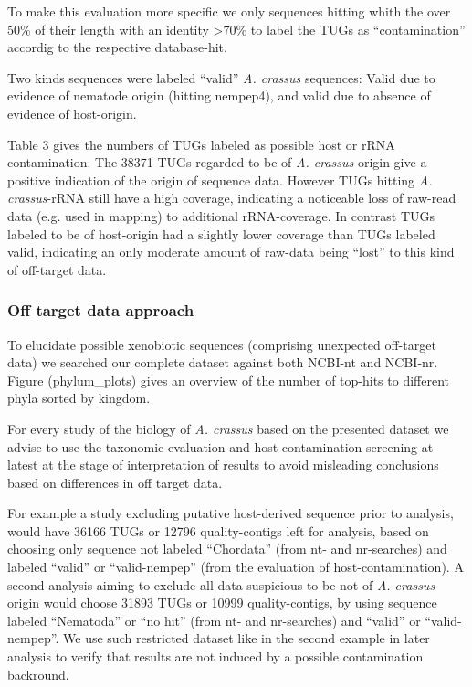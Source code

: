 \documentclass[10pt]{bmc_article}
\newenvironment{bmcformat}{\begin{raggedright}\baselineskip20pt\sloppy\setboolean{publ}{false}}{\end{raggedright}\baselineskip20pt\sloppy}
\begin{document}
\begin{bmcformat}
To make this evaluation more specific we only sequences hitting whith
the over 50\% of their length with an identity >70\% to label the
TUGs as ``contamination'' accordig to the respective database-hit.

Two kinds sequences were labeled ``valid'' \textit{A. crassus}
sequences: Valid due to evidence of nematode origin (hitting nempep4),
and valid due to absence of evidence of host-origin.

Table 3 gives the numbers of TUGs labeled as possible host or rRNA
contamination. The 38371 TUGs regarded to be of
\textit{A. crassus}-origin give a positive indication of the origin of
sequence data. However TUGs hitting \textit{A. crassus}-rRNA still
have a high coverage, indicating a noticeable loss of raw-read data
(e.g. used in mapping) to additional rRNA-coverage. In contrast
TUGs labeled to be of host-origin had a slightly lower coverage than
TUGs labeled valid, indicating an only moderate amount of raw-data
being ``lost'' to this kind of off-target data.

\subsubsection*{Off target data approach}

To elucidate possible xenobiotic sequences (comprising unexpected
off-target data) we searched our complete dataset against both NCBI-nt
and NCBI-nr. Figure (phylum\_plots) gives an overview of the number of
top-hits to different phyla sorted by kingdom.

For every study of the biology of \textit{A. crassus} based on the
presented dataset we advise to use the taxonomic evaluation and
host-contamination screening at latest at the stage of interpretation
of results to avoid misleading conclusions based on differences in
off target data.

For example a study excluding putative host-derived sequence prior to
analysis, would have 36166 TUGs or 12796
quality-contigs left for analysis, based on choosing only sequence not
labeled ``Chordata'' (from nt- and nr-searches) and labeled ``valid''
or ``valid-nempep'' (from the evaluation of host-contamination). A
second analysis aiming to exclude all data suspicious to be not of
\textit{A. crassus}-origin would choose 31893 TUGs or
10999 quality-contigs, by using sequence labeled
``Nematoda'' or ``no hit'' (from nt- and nr-searches) and ``valid'' or
``valid-nempep''. We use such restricted dataset like in the second
example in later analysis to verify that results are not induced by a
possible contamination backround.


\end{bmcformat}
\end{document}
